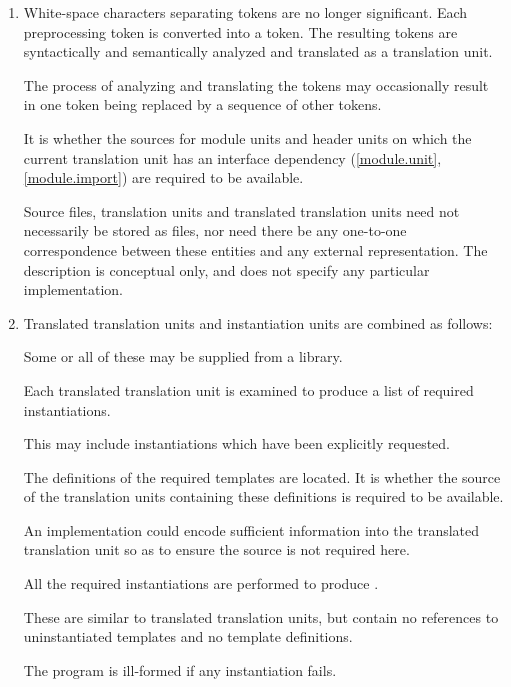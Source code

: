 \documentclass{wg21}
\begin{document}
\begin{enumerate}
    \item White-space characters separating tokens are no longer
    significant. Each preprocessing token is converted into a
    token. The resulting tokens are syntactically and
    semantically analyzed and translated as a translation unit.
    \begin{note}
        The process of analyzing and translating the tokens may occasionally
        result in one token being replaced by a sequence of other
        tokens.
    \end{note}
    It is
    whether the sources for
    module units and header units
    on which the current translation unit has an interface
    dependency (\ref{module.unit}, \ref{module.import})
    are required to be available.
    \begin{note}
        Source files, translation
        units and translated translation units need not necessarily be stored as
        files, nor need there be any one-to-one correspondence between these
        entities and any external representation. The description is conceptual
        only, and does not specify any particular implementation.
    \end{note}

    \item Translated translation units and instantiation units are combined
    as follows:
    \begin{note}
        Some or all of these may be supplied from a
        library.
    \end{note}
    Each translated translation unit is examined to
    produce a list of required instantiations.
    \begin{note}
        This may include
        instantiations which have been explicitly
        requested.
    \end{note}
    The definitions of the
    required templates are located. It is  whether the
    source of the translation units containing these definitions is required
    to be available.
    \begin{note}
        An implementation could encode sufficient
        information into the translated translation unit so as to ensure the
        source is not required here.
    \end{note}
    All the required instantiations
    are performed to produce
    .
    \begin{note}
        These are similar
        to translated translation units, but contain no references to
        uninstantiated templates and no template definitions.
    \end{note}
    The
    program is ill-formed if any instantiation fails.


\end{enumerate}
\end{document}
